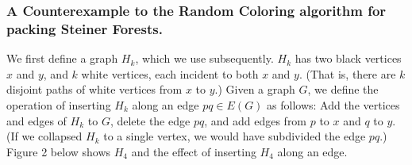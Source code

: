 \documentclass[11pt]{article}
\begin{document}
\subsubsection*{A Counterexample to the Random Coloring algorithm for
packing Steiner Forests.}\label{subsec:counterexample}

We first define a graph $H_k$, which we use subsequently. $H_k$ has
two black vertices $x$ and $y$, and $k$ white vertices, each incident
to both $x$ and $y$. (That is, there are $k$ disjoint paths of white
vertices from $x$ to $y$.) Given a graph $G$, we define the operation
of inserting $H_k$ along an edge $pq \in E(G)$ as follows: Add the
vertices and edges of $H_k$ to $G$, delete the edge $pq$, and add
edges from $p$ to $x$ and $q$ to $y$. (If we collapsed $H_k$ to a
single vertex, we would have subdivided the edge $pq$.) Figure 2 below
shows $H_4$ and the effect of inserting $H_4$ along an edge.
\end{document}
